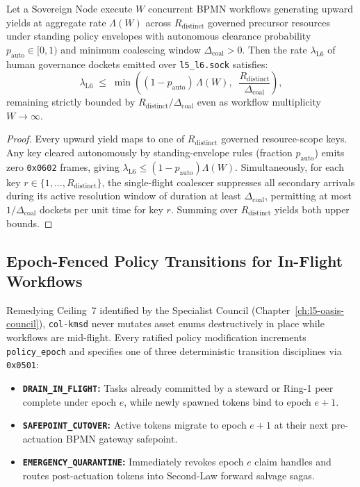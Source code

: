 \begin{theorem}
\label{thm:ch4-bounded-dockets}
Let a Sovereign Node execute $W$ concurrent BPMN workflows generating upward yields at aggregate
rate $\Lambda(W)$ across $R_{\mathrm{distinct}}$ governed precursor resources under standing
policy envelopes with autonomous clearance probability $p_{\mathrm{auto}} \in [0,1)$ and minimum
coalescing window $\Delta_{\mathrm{coal}} > 0$. Then the rate $\lambda_{\mathrm{L6}}$ of human
governance dockets emitted over \texttt{l5\_l6.sock} satisfies:
\[
\lambda_{\mathrm{L6}} \;\le\; \min\!\left(
    (1 - p_{\mathrm{auto}})\, \Lambda(W),\;\;
    \frac{R_{\mathrm{distinct}}}{\Delta_{\mathrm{coal}}}
\right),
\]
remaining strictly bounded by $R_{\mathrm{distinct}} / \Delta_{\mathrm{coal}}$ even as workflow
multiplicity $W \to \infty$.
\end{theorem}

\begin{proof}
Every upward yield maps to one of $R_{\mathrm{distinct}}$ governed resource-scope keys. Any key
cleared autonomously by standing-envelope rules (fraction $p_{\mathrm{auto}}$) emits zero
\texttt{0x0602} frames, giving $\lambda_{\mathrm{L6}} \le (1 - p_{\mathrm{auto}})\Lambda(W)$.
Simultaneously, for each key $r \in \{1, \dots, R_{\mathrm{distinct}}\}$, the single-flight
coalescer suppresses all secondary arrivals during its active resolution window of duration at
least $\Delta_{\mathrm{coal}}$, permitting at most $1 / \Delta_{\mathrm{coal}}$ dockets per unit
time for key $r$. Summing over $R_{\mathrm{distinct}}$ yields both upper bounds.
\end{proof}

\subsection{Epoch-Fenced Policy Transitions for In-Flight Workflows}

Remedying Ceiling~7 identified by the Specialist Council (Chapter~\ref{ch:l5-oasis-council}),
\texttt{col-kmsd} never mutates asset enums destructively in place while workflows are mid-flight.
Every ratified policy modification increments \texttt{policy\_epoch} and specifies one of three
deterministic transition disciplines via \texttt{0x0501}:
\begin{itemize}
\item \textbf{\texttt{DRAIN\_IN\_FLIGHT}:} Tasks already committed by a steward or Ring-1 peer
        complete under epoch $e$, while newly spawned tokens bind to epoch $e + 1$.
\item \textbf{\texttt{SAFEPOINT\_CUTOVER}:} Active tokens migrate to epoch $e + 1$ at their next
        pre-actuation BPMN gateway safepoint.
\item \textbf{\texttt{EMERGENCY\_QUARANTINE}:} Immediately revokes epoch $e$ claim handles and
        routes post-actuation tokens into Second-Law forward salvage sagas.
\end{itemize}

